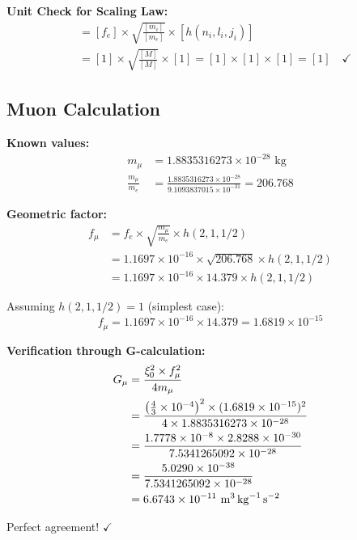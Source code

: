 \documentclass[12pt,a4paper]{article}
\theoremstyle{definition}
\begin{document}
	 
		\textbf{Unit Check for Scaling Law:}
		\begin{align}
			[f_i] &= [f_e] \times \sqrt{\frac{[m_i]}{[m_e]}} \times [h(n_i, l_i, j_i)] \\
			&= [1] \times \sqrt{\frac{[M]}{[M]}} \times [1] = [1] \times [1] \times [1] = [1] \quad \checkmark
		\end{align}
	 
	
	\subsection{Muon Calculation}
	
	\textbf{Known values:}
	\begin{align}
		m_\mu &= 1.8835316273 \times 10^{-28} \text{ kg}\\
		\frac{m_\mu}{m_e} &= \frac{1.8835316273 \times 10^{-28}}{9.1093837015 \times 10^{-31}} = 206.768
	\end{align}
	
	\textbf{Geometric factor:}
	\begin{align}
		f_\mu &= f_e \times \sqrt{\frac{m_\mu}{m_e}} \times h(2,1,1/2)\\
		&= 1.1697 \times 10^{-16} \times \sqrt{206.768} \times h(2,1,1/2)\\
		&= 1.1697 \times 10^{-16} \times 14.379 \times h(2,1,1/2)
	\end{align}
	
	Assuming $h(2,1,1/2) = 1$ (simplest case):
	\begin{equation}
		f_\mu = 1.1697 \times 10^{-16} \times 14.379 = 1.6819 \times 10^{-15}
	\end{equation}
	
	\textbf{Verification through G-calculation:}
	\begin{align}
		G_\mu &= \frac{\xi_0^2 \times f_\mu^2}{4m_\mu}\\
		&= \frac{\left(\frac{4}{3} \times 10^{-4}\right)^2 \times (1.6819 \times 10^{-15})^2}{4 \times 1.8835316273 \times 10^{-28}}\\
		&= \frac{1.7778 \times 10^{-8} \times 2.8288 \times 10^{-30}}{7.5341265092 \times 10^{-28}}\\
		&= \frac{5.0290 \times 10^{-38}}{7.5341265092 \times 10^{-28}}\\
		&= 6.6743 \times 10^{-11} \text{ \si{\metre\cubed\per\kilogram\per\second\squared}}
	\end{align}
	
	Perfect agreement! $\checkmark$
	
\end{document}
